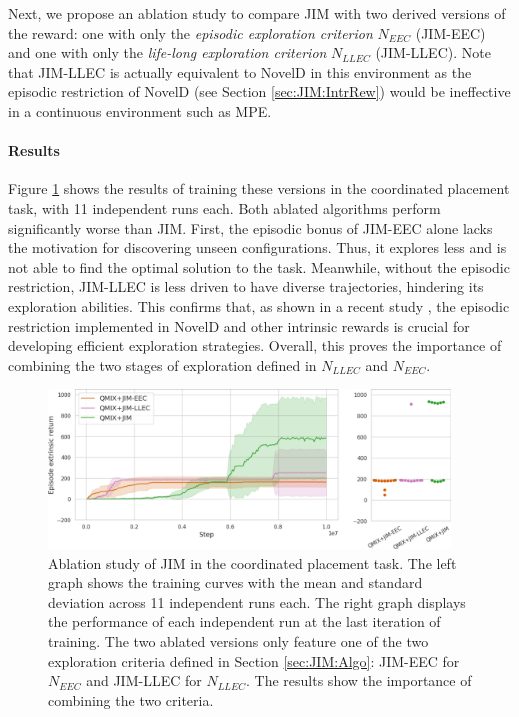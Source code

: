 Next, we propose an ablation study to compare JIM with two derived versions of the reward: one with only the \textit{episodic exploration criterion} $N_{EEC}$ (JIM-EEC) and one with only the \textit{life-long exploration criterion} $N_{LLEC}$ (JIM-LLEC). Note that JIM-LLEC is actually equivalent to NovelD \citep{Zhang2021_NovelD} in this environment as the episodic restriction of NovelD (see Section \ref{sec:JIM:IntrRew}) would be ineffective in a continuous environment such as MPE. 

\paragraph{Results} Figure \ref{fig:JIM:ablation_results} shows the results of training these versions in the coordinated placement task, with 11 independent runs each. Both ablated algorithms perform significantly worse than JIM. First, the episodic bonus of JIM-EEC alone lacks the motivation for discovering unseen configurations. Thus, it explores less and is not able to find the optimal solution to the task. Meanwhile, without the episodic restriction, JIM-LLEC is less driven to have diverse trajectories, hindering its exploration abilities. This confirms that, as shown in a recent study \citep{Andres2022_EvalIntrRew}, the episodic restriction implemented in NovelD and other intrinsic rewards \citep{Raileanu2020_RIDE,Badia2020_NGU} is crucial for developing efficient exploration strategies.  Overall, this proves the importance of combining the two stages of exploration defined in $N_{LLEC}$ and $N_{EEC}$. 

\begin{figure}[t]
    \centering
    \includegraphics[width=0.95\textwidth]{Figures/JIM/ablationR.png}
    \caption{Ablation study of JIM in the coordinated placement task. The left graph shows the training curves with the mean and standard deviation across 11 independent runs each. The right graph displays the performance of each independent run at the last iteration of training. The two ablated versions only feature one of the two exploration criteria defined in Section \ref{sec:JIM:Algo}: JIM-EEC for $N_{EEC}$ and JIM-LLEC for $N_{LLEC}$. The results show the importance of combining the two criteria.}
    \label{fig:JIM:ablation_results}
\end{figure}




